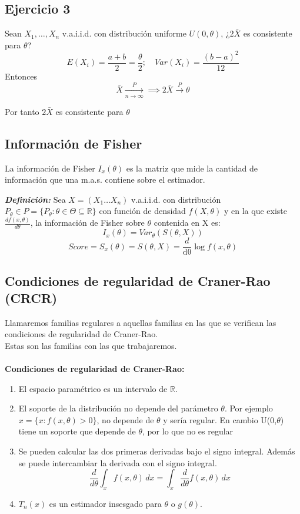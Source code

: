 \subsection*{Ejercicio 3}
Sean $X_1, \dots, X_n$ v.a.i.i.d. con distribución uniforme $U(0,\theta)$, ¿$2 \bar{X}$ es consistente para $\theta$?
\[
    E(X_i)=\frac{a+b}{2}=\frac{\theta}{2};\quad Var(X_i)=\frac{(b-a)^2}{12}
\]
Entonces
\[
    \bar{X} \xrightarrow[n \to \infty]{P} \implies 2 \bar{X} \xrightarrow{P} \theta
\]

Por tanto $2 \bar{X}$ es consistente para $\theta$

\newpage

\subsection{Información de Fisher}

La información de Fisher $I_x(\theta)$ es la matriz que mide la cantidad
de información que una m.a.s. contiene sobre el estimador.

\textbf{\textit{Definición: }} Sea $X=(X_1 \dots X_n)$ v.a.i.i.d. con distribución $P_\theta \in P=\{P_\theta : \theta \in \Theta \subseteq \mathbb{R}\}$ con función de densidad $f(X,\theta)$ y en la que existe $\frac{d f(x,\theta)}{d \theta}$, la información de Fisher sobre $\theta$ contenida en X es:
\[
    I_x(\theta) = Var_\theta (S(\theta,X))
\]
\[
    Score=S_x(\theta)=S(\theta,X)=\frac{d}{\mathrm{d\theta}}\log f(x,\theta)
\]
\subsection{Condiciones de regularidad de Craner-Rao (CRCR)}

Llamaremos familias regulares a aquellas familias en las que se verifican las
condiciones de regularidad de Craner-Rao.
\\ Estas son las familias con las que trabajaremos.
\\ \\\textbf{Condiciones de regularidad de Craner-Rao:}
\begin{enumerate}
    \item El espacio paramétrico es un intervalo de $\mathbb{R}$.
    \item El soporte de la distribución no depende del parámetro $\theta$.
          Por ejemplo $x=\{x:f(x,\theta) > 0 \}$, no depende de $\theta$ y sería regular. En cambio U(0,$\theta$)
          tiene un soporte que depende de $\theta$, por lo que no es regular
    \item Se pueden calcular las dos primeras derivadas bajo el signo integral.
          Además se puede intercambiar la derivada con el signo integral.
          \[
              \frac{d}{d \theta} \int_{x} f(x,\theta)  \,dx = \int_{x} \frac{d}{d \theta} f(x,\theta)  \,dx
          \]
    \item $T_n(x)$ es un estimador insesgado para $\theta$ o $g(\theta)$.
\end{enumerate}

